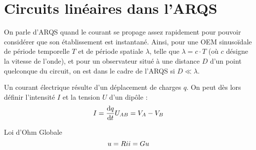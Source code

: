 \documentclass[11pt,a4paper,fleqn,pdftex]{report}
\begin{document}
\section{Circuits linéaires dans l'\gls{ARQS}} %
\label{sec:circuits_lineaires_dans_l_ARQS}
\begin{dfn}
   On parle d'\gls{ARQS} quand le courant se propage assez rapidement pour pouvoir considérer que son établissement est instantané. \newline
   Ainsi, pour une \gls{OEM} sinusoïdale de période temporelle $T$ et de période spatiale $\lambda$, telle que $\lambda = c\cdot T$ (où $c$ désigne la vitesse de l'onde), et pour un observateur situé à une distance $D$ d'un point quelconque du circuit, on est dans le cadre de l'\gls{ARQS} si $D \ll \lambda$. \\
\end{dfn}
%
\begin{dfn}
Un courant électrique résulte d'un déplacement de charges $q$. On peut dès lors définir l'intensité $I$ et la tension $U$ d'un dipôle : 
\begin{equation}\label{GrandeursElect}
I = \dfrac{\mathrm{d} q}{\mathrm{d} t}\\
U_{AB} = V_A-V_B
\end{equation}
\end{dfn}
%
\begin{theorem}
Loi d'Ohm Globale
\begin{equation}\label{LoiOhm}
u = Ri \\ i = Gu
\end{equation}
\end{theorem}
%
\end{document}
